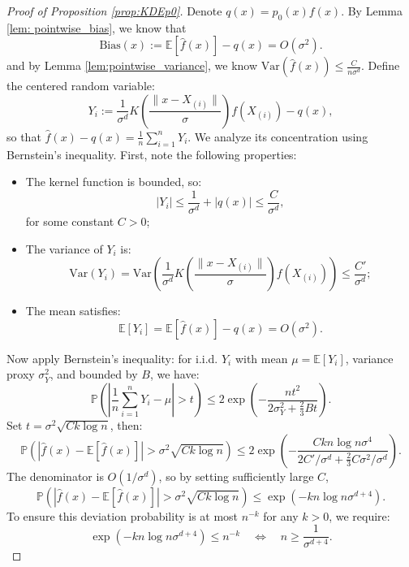 \documentclass{article}
\begin{document}
\begin{proof}[Proof of Proposition \ref{prop:KDEp0}]
Denote \(q(x)=p_0(x)f(x)\). By Lemma \ref{lem: pointwise_bias}, we know that
\[
\text{Bias}(x) := \mathbb{E}[\hat{f}(x)] - q(x)
=  O(\sigma^2).
\]
and by Lemma \ref{lem:pointwise_variance}, we know $\mathrm{Var}(\hat{f}(x)) \leq \frac{C}{n \sigma^d}.$  Define the centered random variable:
\[
Y_i := \frac{1}{\sigma^d} K\left( \frac{\|x - X_{(i)}\|}{\sigma} \right)f(X_{(i)}) - q(x),
\]
so that \( \hat{f}(x) - q(x) = \frac{1}{n} \sum_{i=1}^n Y_i \). We analyze its concentration using Bernstein’s inequality.
First, note the following properties:
\begin{itemize}
    \item The kernel function is bounded, so:
\[
|Y_i| \le \frac{1}{\sigma^d} + |q(x)| \le \frac{C}{\sigma^d},
\]
for some constant \(C > 0\);
\item The variance of \(Y_i\) is:
\[
\mathrm{Var}(Y_i) = \mathrm{Var}\left( \frac{1}{\sigma^d} K\left( \frac{\|x - X_{(i)}\|}{\sigma} \right) f(X_{(i)})\right) \le \frac{C'}{\sigma^d};
\]
\item  The mean satisfies:
\[
\mathbb{E}[Y_i] = \mathbb{E}[\hat{f}(x)] - q(x) = O(\sigma^2).
\]
\end{itemize}
Now apply Bernstein’s inequality: for i.i.d. \(Y_i\) with mean \(\mu = \mathbb{E}[Y_i]\), variance proxy \(\sigma_Y^2\), and bounded by \(B\), we have:
\[
\mathbb{P}\left( \left| \frac{1}{n} \sum_{i=1}^n Y_i - \mu \right| > t \right)
\le 2 \exp\left( - \frac{n t^2}{2 \sigma_Y^2 + \frac{2}{3} B t} \right).
\]
Set \( t = \sigma^2 \sqrt{C k \log n} \), then:
\[
\mathbb{P}\left( \left| \hat{f}(x) - \mathbb{E}[\hat{f}(x)] \right| > \sigma^2 \sqrt{C k\log n} \right)
\le 2 \exp\left( - \frac{Ck n \log n \sigma^4}{2 C'/\sigma^d + \frac{2}{3} C \sigma^2 / \sigma^d} \right).
\]
The denominator is \( O(1/\sigma^d) \), so by setting sufficiently large $C$,
\[
\mathbb{P}\left( \left| \hat{f}(x) - \mathbb{E}[\hat{f}(x)] \right| > \sigma^2 \sqrt{C k\log n}\right)
\le  \exp\left( - k n \log n \sigma^{d+4} \right).
\]
To ensure this deviation probability is at most \(n^{-k}\) for any \(k > 0\), we require:
\[
\exp\left( - k n \log n \sigma^{d+4} \right) \le n^{-k}
\quad \Longleftrightarrow \quad
n \ge \frac{1 }{\sigma^{d+4}}.
\]
\end{proof}
\end{document}

